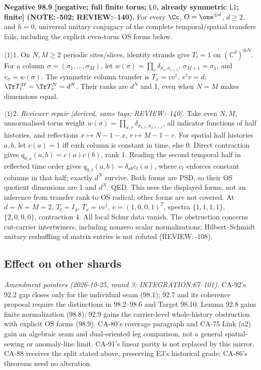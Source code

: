 \textbf{Negative 98.9 [negative; full finite torus; \(\mathsf L0\), already symmetric \(\mathsf L1\); finite] (NOTE:--502; REVIEW:--140).}
For every \(\Cc\), \(O=\one^{\oplus d}\), \(d\ge2\), and \(h=0\), universal unitary conjugacy of the complete
temporal/spatial transfers fails, including the explicit even-torus OS forms below.
\par\(\langle1\rangle1\). On \(N,M\ge2\) periodic sites/slices, identity strands give \(T_t=1\) on
\((\mathbb C^d)^{\otimes N}\). For a column \(\sigma=(\sigma_1,\ldots,\sigma_M)\), let
\(w(\sigma)=\prod_r\delta_{\sigma_r,\sigma_{r+1}}\), \(\sigma_{M+1}=\sigma_1\), and \(v_\sigma=w(\sigma)\).
The symmetric column transfer is \(T_x=vv^\dagger\), \(v^\dagger v=d\);
\(\Tr T_t^M=\Tr T_x^N=d^N\). Their ranks are \(d^N\) and 1, even when \(N=M\) makes dimensions equal.
\par\(\langle1\rangle2\). \emph{Reviewer repair [derived, same tags; REVIEW:--140].}
Take even \(N,M\), unnormalised torus weight
\(w(\sigma)=\prod_{x,r}\delta_{\sigma_{x,r},\sigma_{x,r+1}}\), all indicator functions of half histories,
and reflections \(x\mapsto N-1-x\), \(r\mapsto M-1-r\).
For spatial half histories \(a,b\), let \(c(a)=1\) iff each column is constant in time, else 0.
Direct contraction gives \(q_{0,x}(a,b)=c(a)c(b)\), rank 1. Reading the second temporal half in reflected
time order gives \(q_{0,t}(a,b)=\delta_{ab}c_t(a)\), where \(c_t\) enforces constant columns in that half;
exactly \(d^N\) survive. Both forms are PSD, so their OS quotient dimensions are 1 and \(d^N\). QED.
This uses the displayed forms, not an inference from transfer rank to OS radical; other forms are not covered.
At \(d=N=M=2\), \(T_t=I_4\), \(T_x=vv^\dagger\), \(v=(1,0,0,1)^T\), spectra
\(\{1,1,1,1\}\), \(\{2,0,0,0\}\), contraction 4. All local Schur data vanish.
The obstruction concerns cut-carrier intertwiners, including nonzero scalar normalizations;
Hilbert--Schmidt unitary reshuffling of matrix entries is not refuted (REVIEW:--108).

\subsection{Effect on other shards}

\emph{Amendment pointers (2026-10-25, round 3; INTEGRATION:67--101).}
CA-92's 92.2 gap closes only for the individual seam (98.1); 92.7 and its coherence proposal require the
distinctions in 98.2--98.6 and Target 98.10. Lemma 92.8 gains finite normalization (98.8); 92.9 gains
the carrier-level whole-history obstruction with explicit OS forms (98.9).
CA-80's coverage paragraph and CA-75 Link (a2) gain an algebraic seam and dual-oriented leg comparison,
not a general spatial-sewing or anomaly-line limit. CA-91's linear parity is not replaced by this mirror.
CA-88 receives the split stated above, preserving E3's historical grade; CA-86's theorems need no alteration.

